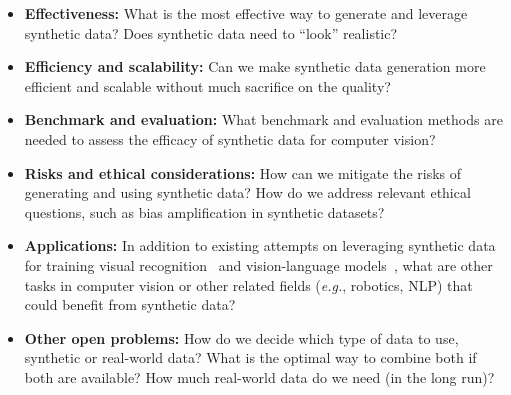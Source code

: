 \documentclass{article}
\begin{document}
\begin{itemize}
    \item  \textbf{Effectiveness:} What is the most effective way to generate and leverage synthetic data? Does synthetic data need to “look” realistic?
    \item \textbf{Efficiency and scalability:} Can we make synthetic data generation more efficient and scalable without much sacrifice on the quality?
    \item \textbf{Benchmark and evaluation:} What benchmark and evaluation methods are needed to assess the efficacy of synthetic data for computer vision?
    \item \textbf{Risks and ethical considerations:} How can we mitigate the risks of generating and using synthetic data? How do we address relevant ethical questions, such as bias amplification in synthetic datasets? 
    \item \textbf{Applications:} In addition to existing attempts on leveraging synthetic data for training visual recognition~\cite{li2023benchmarking,Shipard2023DiversityID,Sariyildiz2022FakeIT} and vision-language models~\cite{nguyen2023improving,yang2023alip,li2023stablellava}, what are other tasks in computer vision or other related fields (\emph{e.g.}, robotics, NLP) that could benefit from synthetic data?
    \item \textbf{Other open problems:} How do we decide which type of data to use, synthetic or real-world data? What is the optimal way to combine both if both are available? How much real-world data do we need (in the long run)? 

\end{itemize}

\end{document}
